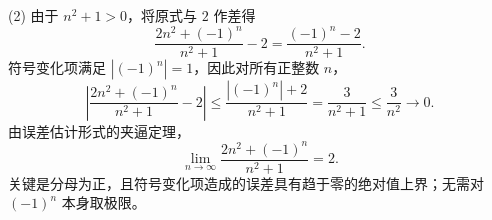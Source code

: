 \documentclass[UTF8,fontset=fandol,11pt]{ctexart}
\begin{document}
(2) 由于 $n^2+1>0$，将原式与 $2$ 作差得
\[
\frac{2n^2+(-1)^n}{n^2+1}-2
=\frac{(-1)^n-2}{n^2+1}.
\]
符号变化项满足 $|(-1)^n|=1$，因此对所有正整数 $n$，
\[
\left|\frac{2n^2+(-1)^n}{n^2+1}-2\right|
\leq\frac{|(-1)^n|+2}{n^2+1}
=\frac3{n^2+1}\leq\frac3{n^2}\to0.
\]
由误差估计形式的夹逼定理，
\[
\lim_{n\to\infty}\frac{2n^2+(-1)^n}{n^2+1}=2.
\]
关键是分母为正，且符号变化项造成的误差具有趋于零的绝对值上界；无需对 $(-1)^n$ 本身取极限。\par
\end{document}

